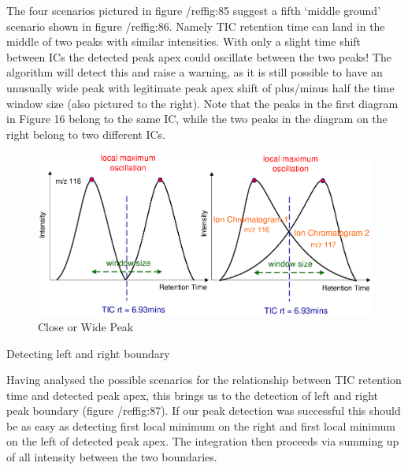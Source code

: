 The four scenarios pictured in figure /ref{fig:85} suggest a fifth ‘middle 
ground’ scenario shown in figure /ref{fig:86}. Namely TIC retention time can 
land in the middle of two peaks with similar intensities. With only a slight 
time shift between ICs the detected peak apex could oscillate between the two 
peaks! The algorithm will detect this and raise a warning, as it is still 
possible to have an unusually wide peak with legitimate peak apex shift of 
plus/minus half the time window size (also pictured to the right). Note that 
the peaks in the first diagram in Figure 16 belong to the same IC, while the 
two peaks in the diagram on the right belong to two different ICs.

\begin{figure}
  \begin{center}
    \includegraphics[scale=1]{graphics/chapter08/86.eps}
  \end{center}
  \caption{Close or Wide Peak}
  \label{fig:86}
\end{figure}

Detecting left and right boundary

Having analysed the possible scenarios for the relationship between TIC 
retention time and detected peak apex, this brings us to the detection of left 
and right peak boundary (figure /ref{fig:87}). If our peak detection was 
successful this should be as easy as detecting first local minimum on the right 
and first local minimum on the left of detected peak apex. The integration then 
proceeds via summing up of all intensity between the two boundaries.

